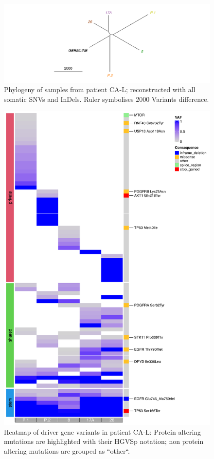 \begin{figure}[ht]
	\centering
	\includegraphics[width=.99\linewidth]{Figures/CASCADE/CA86/CA86phylo.pdf}
	\caption[Phylogeny of autopsy samples from patient CA-L]{Phylogeny of samples from patient CA-L; reconstructed with all somatic SNVs and InDels. Ruler symbolises 2000 Variants difference.} \label{fig:ca86phylo}
\end{figure}


\begin{figure}[ht]
\centering
\includegraphics[width=.99\linewidth]{Figures/CASCADE/CA86/CA86varHeatmap.pdf}
\caption[Heatmap of driver gene variants in patient CA-L]{Heatmap of driver gene variants in patient CA-L: Protein altering mutations are highlighted with their HGVSp notation; non protein altering mutations are grouped as ``other``.} \label{fig:cas86heatmap}
\end{figure}


